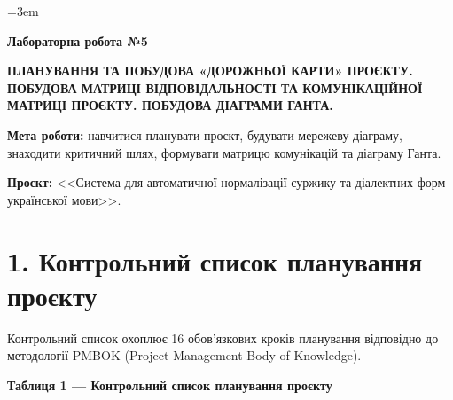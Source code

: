 \documentclass[14pt]{extarticle}
\begin{document}
\sloppy
\emergencystretch=3em
\setlength{\tabcolsep}{4pt}

\begin{center}
\textbf{Лабораторна робота №5}

\medskip

\textbf{\MakeUppercase{Планування та побудова «Дорожньої карти» проєкту. Побудова матриці відповідальності та комунікаційної матриці проєкту. Побудова діаграми Ганта.}}
\end{center}

\medskip

\textbf{Мета роботи:} навчитися планувати проєкт, будувати мережеву діаграму, знаходити критичний шлях, формувати матрицю комунікацій та діаграму Ганта.

\textbf{Проєкт:} <<Система для автоматичної нормалізації суржику та діалектних форм української мови>>.

\section*{1. Контрольний список планування проєкту}

Контрольний список охоплює 16 обов'язкових кроків планування відповідно до методології PMBOK (Project Management Body of Knowledge).

\vspace{6pt}
\noindent\textbf{Таблиця 1 --- Контрольний список планування проєкту}
\end{document}
